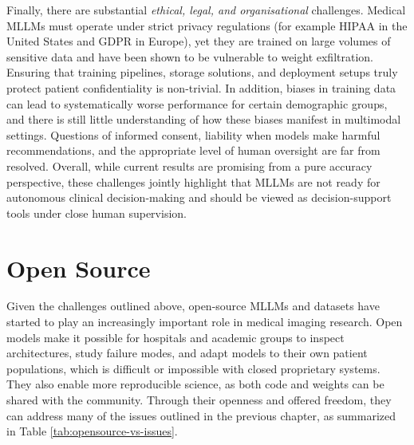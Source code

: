 \documentclass{imc-inf}
\begin{document}
Finally, there are substantial \emph{ethical, legal, and organisational} challenges.
Medical MLLMs must operate under strict privacy regulations (for example HIPAA in the United States and GDPR in Europe), yet they are trained on large volumes of sensitive data and have been shown to be vulnerable to weight exfiltration.\cite{alsaad2024multimodal}
Ensuring that training pipelines, storage solutions, and deployment setups truly protect patient confidentiality is non-trivial.
In addition, biases in training data can lead to systematically worse performance for certain demographic groups, and there is still little understanding of how these biases manifest in multimodal settings.
Questions of informed consent, liability when models make harmful recommendations, and the appropriate level of human oversight are far from resolved.
Overall, while current results are promising from a pure accuracy perspective, these challenges jointly highlight that MLLMs are not ready for autonomous clinical decision-making and should be viewed as decision-support tools under close human supervision.

\chapter{Open Source}\label{chap:opensource}

Given the challenges outlined above, open-source MLLMs and datasets have started to play an increasingly important role in medical imaging research.
Open models make it possible for hospitals and academic groups to inspect architectures, study failure modes, and adapt models to their own patient populations, which is difficult or impossible with closed proprietary systems.
They also enable more reproducible science, as both code and weights can be shared with the community.
Through their openness and offered freedom, they can address many of the issues outlined in the previous chapter, as summarized in Table \ref{tab:opensource-vs-issues}.
\end{document}
